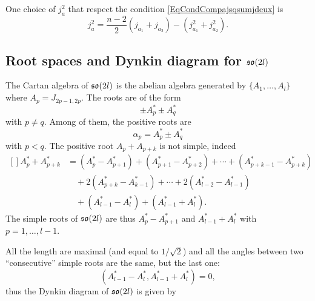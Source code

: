 One choice of $j_a^2$ that respect the condition \eqref{EqCondCompajsqsumjdeux} is
\begin{equation}
	j_a^2=\frac{ n-2 }{2}(j_{a_1}+j_{a_2})-(j_{a_1}^2+j_{a_2}^2).
\end{equation}

\subsection{Root spaces and Dynkin diagram for \texorpdfstring{$\operatorname{\mathfrak{so}}(2l)$}{so(21)}}

The Cartan algebra of $\operatorname{\mathfrak{so}}(2l)$ is the abelian algebra generated by $\{ A_1,\ldots,A_l \}$ where $A_p=J_{2p-1,2p}$. The roots are of the form
\begin{equation}
	\pm A_p^*\pm A^*_q
\end{equation}
with $p\neq q$. Among of them, the positive roots are
\begin{equation}
	\alpha_p=A^*_p\pm A^*_q
\end{equation}
with $p<q$. The positive root $A_p+A_{p+k}$ is not simple, indeed
\begin{equation}
	\begin{aligned}[]
		A^*_p+A^*_{p+k}	&= (A^*_p-A^*_{p+1})+(A^*_{p+1}-A^*_{p+2})+\cdots+(A^*_{p+k-1}-A^*_{p+k})\\
		&\quad +2(A^*_{p+k}-A^*_{k-1})+\cdots+2(A^*_{l-2}-A^*_{l-1})\\
		&\quad +(A^*_{l-1}-A^*_l)+(A^*_{l-1}+A^*_l).
	\end{aligned}
\end{equation}
The simple roots of $\operatorname{\mathfrak{so}}(2l)$ are thus $A^*_p-A^*_{p+1}$ and $A^*_{l-1}+A^*_l$ with $p=1,\ldots,l-1$.

All the length are maximal (and equal to $1/\sqrt{2}$) and all the angles between two ``consecutive'' simple roots are the same, but the last one:
\begin{equation}
	(A^*_{l-1}-A^*_{l},A^*_{l-1}+A^*_{l})=0,
\end{equation}
thus the Dynkin diagram of $\operatorname{\mathfrak{so}}(2l)$ is given by
\begin{center}
   
\end{center}

